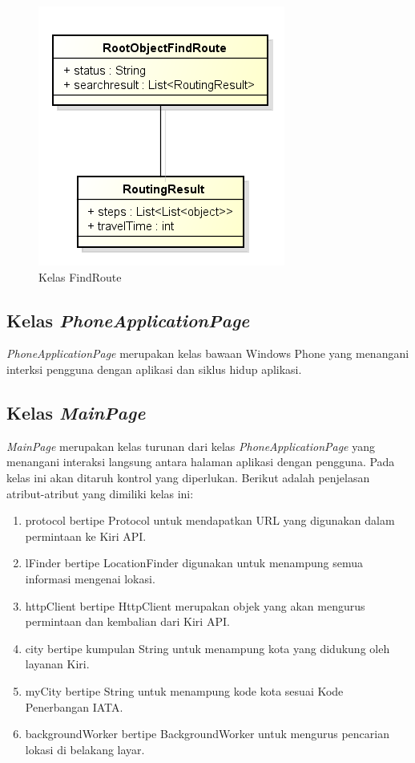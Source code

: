 \begin{figure}[h!]
	\centering
		\includegraphics[scale=0.6]{Gambar/useCase_dan_Class/perClass/FindRoute}
	\caption{Kelas FindRoute}
	\label{fig:kelasFindRoute}
\end{figure}


\subsection{Kelas \textit{PhoneApplicationPage}}
\label{lab:Kelas PhoneApplicationPage}
\hspace{0.5cm} \textit{PhoneApplicationPage} merupakan kelas bawaan Windows Phone yang menangani interksi pengguna dengan aplikasi dan siklus hidup aplikasi.

\subsection{Kelas \textit{MainPage}}
\label{lab:Kelas MainPage}
\hspace{0.5cm} \textit{MainPage} merupakan kelas turunan dari kelas \textit{PhoneApplicationPage} yang menangani interaksi langsung antara halaman aplikasi dengan pengguna. Pada kelas ini akan ditaruh kontrol yang diperlukan. Berikut adalah penjelasan atribut-atribut yang dimiliki kelas ini:
\begin{enumerate}
	\item protocol bertipe Protocol untuk mendapatkan URL yang digunakan dalam permintaan ke Kiri API.
	\item lFinder bertipe LocationFinder digunakan untuk menampung semua informasi mengenai lokasi.
	\item httpClient bertipe HttpClient merupakan objek yang akan mengurus permintaan dan kembalian dari Kiri API.
	\item city bertipe kumpulan String untuk menampung kota yang didukung oleh layanan Kiri.
	\item myCity bertipe String untuk menampung kode kota sesuai Kode Penerbangan IATA.
	\item backgroundWorker bertipe BackgroundWorker untuk mengurus pencarian lokasi di belakang layar.
\end{enumerate}

